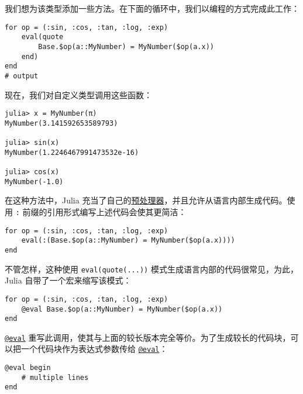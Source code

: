 我们想为该类型添加一些方法。在下面的循环中，我们以编程的方式完成此工作：




\begin{verbatim}
for op = (:sin, :cos, :tan, :log, :exp)
    eval(quote
        Base.$op(a::MyNumber) = MyNumber($op(a.x))
    end)
end
# output

\end{verbatim}



现在，我们对自定义类型调用这些函数：




\begin{verbatim}
julia> x = MyNumber(π)
MyNumber(3.141592653589793)

julia> sin(x)
MyNumber(1.2246467991473532e-16)

julia> cos(x)
MyNumber(-1.0)
\end{verbatim}



在这种方法中，Julia 充当了自己的\href{https://en.wikipedia.org/wiki/Preprocessor}{预处理器}，并且允许从语言内部生成代码。使用 \texttt{:} 前缀的引用形式编写上述代码会使其更简洁：




\begin{verbatim}
for op = (:sin, :cos, :tan, :log, :exp)
    eval(:(Base.$op(a::MyNumber) = MyNumber($op(a.x))))
end
\end{verbatim}



不管怎样，这种使用 \texttt{eval(quote(...))} 模式生成语言内部的代码很常见，为此，Julia 自带了一个宏来缩写该模式：




\begin{verbatim}
for op = (:sin, :cos, :tan, :log, :exp)
    @eval Base.$op(a::MyNumber) = MyNumber($op(a.x))
end
\end{verbatim}



\hyperlink{12895501458291832858}{\texttt{@eval}} 重写此调用，使其与上面的较长版本完全等价。为了生成较长的代码块，可以把一个代码块作为表达式参数传给 \hyperlink{12895501458291832858}{\texttt{@eval}}：




\begin{verbatim}
@eval begin
    # multiple lines
end
\end{verbatim}



